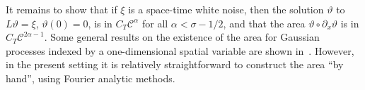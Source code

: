 \documentclass[a4paper,11pt]{article}
\newcommand{\mathD}{\mathrm{D}}
\newcommand{\mathd}{\mathrm{d}}
\theoremstyle{remark}
\newcommand{\R}{\mathbb{R}}
\newcommand{\Z}{\mathbb{Z}}
\newcommand{\E}{\mathbb{E}}
\newcommand{\CC}{\ensuremath{\mathscr{C}}}
\newcommand{\CF}{\ensuremath{\mathscr{F}}}
\newcommand{\reso}{\,\mathord{\circ}\,}
\begin{document}
%

It remains to show that if $\xi$ is a space-time white noise, then the solution $\vartheta$ to $L \vartheta = \xi$, $\vartheta(0) = 0$, is in $C_T\CC^\alpha$ for all $\alpha < \sigma - 1/2$, and that the area $\vartheta \reso \partial_x \vartheta$ is in $C_T \CC^{2 \alpha - 1}$. Some general results on the existence of the area for Gaussian processes indexed by a one-dimensional spatial variable are shown in~\cite{Friz2012}. However, in the present setting it is relatively straightforward to construct the area ``by hand'', using Fourier analytic methods.
%
\end{document}
